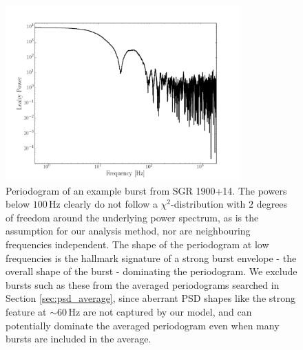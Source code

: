 \documentclass[numberedappendix]{emulateapj}
\newcommand{\hz}{\,\mathrm{Hz}}
\begin{document}
\begin{figure}[htbp]
\begin{center}
\includegraphics[width=9cm]{f2.pdf}
\caption{Periodogram of an example burst from SGR 1900+14. The powers below $100 \hz$ clearly do not follow a $\chi^2$-distribution with $2$ degrees of freedom around the underlying power spectrum, as is the assumption for our analysis method, nor are neighbouring frequencies independent. The shape of the periodogram at low frequencies is the hallmark signature of a strong burst envelope - the overall shape of the burst - dominating the periodogram. We exclude bursts such as these from the averaged periodograms searched in Section \ref{sec:psd_average}, since aberrant PSD shapes like the strong feature at $\sim 60 \hz$ are not captured by our model, and can potentially dominate the averaged periodogram even when many bursts are included in the average.}
\label{fig:envelope_example}
\end{center}
\end{figure}
\end{document}

